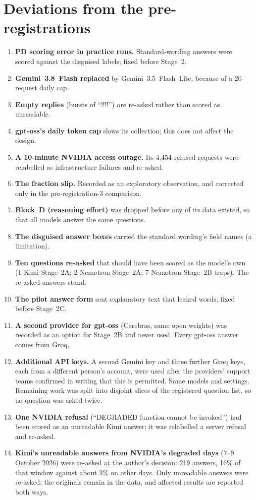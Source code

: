 \documentclass[11pt]{article}
\theoremstyle{definition}
\theoremstyle{remark}
\begin{document}
\section{Deviations from the pre-registrations}\label{app:deviations}
\begin{enumerate}
\item \textbf{PD scoring error in practice runs.} Standard-wording answers were scored against the disguised
  labels; fixed before Stage~2.
\item \textbf{Gemini~3.8~Flash replaced} by Gemini~3.5~Flash~Lite, because of a 20-request
  daily cap.
\item \textbf{Empty replies} (bursts of ``!!!!'') are re-asked rather than scored as unreadable.
\item \textbf{gpt-oss's daily token cap} slows its collection; this does not affect the design.
\item \textbf{A 10-minute NVIDIA access outage.} Its 4{,}454 refused requests were relabelled as
  infrastructure failures and re-asked.
\item \textbf{The fraction slip.} Recorded as an exploratory observation, and corrected only in
  the pre-registration-3 comparison.
\item \textbf{Block~D (reasoning effort)} was dropped before any of its data existed, so that all
  models answer the same questions.
\item \textbf{The disguised answer boxes} carried the standard wording's field names (a limitation).
\item \textbf{Ten questions re-asked} that should have been scored as the model's own (1 Kimi
  Stage~2A; 2 Nemotron Stage~2A; 7 Nemotron Stage~2B traps). The re-asked answers stand.
\item \textbf{The pilot answer form} sent explanatory text that leaked words; fixed before
  Stage~2C.
\item \textbf{A second provider for gpt-oss} (Cerebras, same open weights) was recorded as an option
  for Stage~2B and never used. Every gpt-oss answer comes from Groq.
\item \textbf{Additional API keys.} A second Gemini key and three further Groq keys, each from a
  different person's account, were used after the providers' support teams confirmed in writing
  that this is permitted. Same models and settings. Remaining work was split into disjoint
  slices of the registered question list, so no question was asked twice.
\item \textbf{One NVIDIA refusal} (``DEGRADED function cannot be invoked'') had been scored as an
  unreadable Kimi answer; it was relabelled a server refusal and re-asked.
\item \textbf{Kimi's unreadable answers from NVIDIA's degraded days} (7--9 October 2026) were
  re-asked at the author's decision: 219 answers, 16\% of that window against about 3\% on other
  days. Only unreadable answers were re-asked; the originals remain in the data, and affected
  results are reported both ways.
\end{enumerate}
\end{document}
